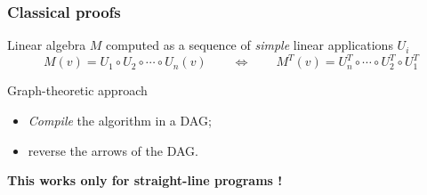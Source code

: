 \documentclass[10pt]{beamer}
\begin{document}
\begin{frame}
  \frametitle{Classical proofs}

  \begin{block}{Linear algebra}
    $M$ computed as a sequence of \emph{simple} linear applications $U_i$
    \begin{equation*}
      M(v) = U_1\circ U_2\circ\cdots\circ U_n(v)
      \qquad\Leftrightarrow\qquad
      M^T(v) = U_n^T\circ\cdots\circ U_2^T\circ U_1^T
    \end{equation*}
  \end{block}

  \begin{block}{Graph-theoretic approach}
    \begin{itemize}
    \item \emph{Compile} the algorithm in a DAG;
    \item reverse the arrows of the DAG.
    \end{itemize}
    \begin{center}
      \textbf{This works only for straight-line programs !}
    \end{center}
  \end{block}
\end{frame}
\end{document}
